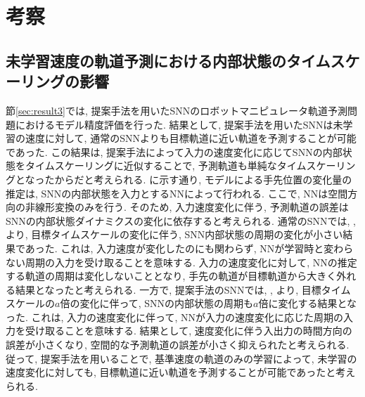 \section{考察}
\subsection{未学習速度の軌道予測における内部状態のタイムスケーリングの影響}
節\ref{sec:result3}では, 提案手法を用いたSNNのロボットマニピュレータ軌道予測問題におけるモデル精度評価を行った.
結果として, 提案手法を用いたSNNは未学習の速度に対して, 通常のSNNよりも目標軌道に近い軌道を予測することが可能であった.
この結果は, 提案手法によって入力の速度変化に応じてSNNの内部状態をタイムスケーリングに近似することで, 予測軌道も単純なタイムスケーリングとなったからだと考えられる.
に示す通り, モデルによる手先位置の変化量の推定は, SNNの内部状態を入力とするNNによって行われる.
ここで, NNは空間方向の非線形変換のみを行う.
そのため, 入力速度変化に伴う, 予測軌道の誤差はSNNの内部状態ダイナミクスの変化に依存すると考えられる.
通常のSNNでは, , より, 目標タイムスケールの変化に伴う, SNN内部状態の周期の変化が小さい結果であった.
これは, 入力速度が変化したのにも関わらず, NNが学習時と変わらない周期の入力を受け取ることを意味する.
入力の速度変化に対して, NNの推定する軌道の周期は変化しないこととなり, 手先の軌道が目標軌道から大きく外れる結果となったと考えられる.
一方で, 提案手法のSNNでは, , より, 目標タイムスケールの$a$倍の変化に伴って, SNNの内部状態の周期も$a$倍に変化する結果となった.
これは, 入力の速度変化に伴って, NNが入力の速度変化に応じた周期の入力を受け取ることを意味する.
結果として, 速度変化に伴う入出力の時間方向の誤差が小さくなり, 空間的な予測軌道の誤差が小さく抑えられたと考えられる.
従って, 提案手法を用いることで, 基準速度の軌道のみの学習によって, 未学習の速度変化に対しても, 目標軌道に近い軌道を予測することが可能であったと考えられる.

